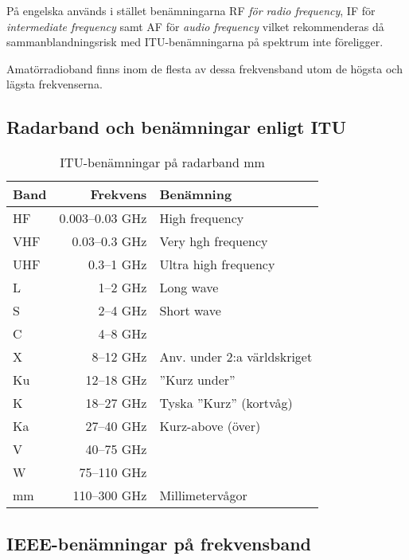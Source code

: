 På engelska används i stället be\-nämn\-ing\-ar\-na RF {\it för radio
  frequency}, IF för {\it intermediate frequency} samt AF för {\it audio
  frequency} vilket rekommenderas då sammanblandningsrisk med
ITU-be\-nämn\-ing\-ar\-na på spektrum inte föreligger.

Amatörradioband finns inom de flesta av dessa frekvensband utom de högsta och
lägsta frekvenserna.

\subsection{Radarband och benämningar enligt ITU}

\begin{table}[H]
\centering

\begin{tabular}{lrl}
	\textbf{Band} & \textbf{Frekvens} & \textbf{Benämning}          \\ \hline
	HF            &   0.003--0.03 GHz & High frequency              \\
	VHF           &     0.03--0.3 GHz & Very hgh frequency          \\
	UHF           &        0.3--1 GHz & Ultra high frequency        \\
	L             &          1--2 GHz & Long wave                   \\
	S             &          2--4 GHz & Short wave                  \\
	C             &          4--8 GHz &  \\
	X             &         8--12 GHz & Anv. under 2:a världskriget \\
	Ku            &        12--18 GHz & ''Kurz under''              \\
	K             &        18--27 GHz & Tyska ''Kurz'' (kortvåg)    \\
	Ka            &        27--40 GHz & Kurz-above (över)           \\
	V             &        40--75 GHz &  \\
	W             &       75--110 GHz &  \\
	mm            &      110--300 GHz & Millimetervågor
\end{tabular}
\caption{ITU-benämningar på radarband mm}
\end{table}

\subsection{IEEE-benämningar på frekvensband}
\label{sec:IEEE-benamningar}

